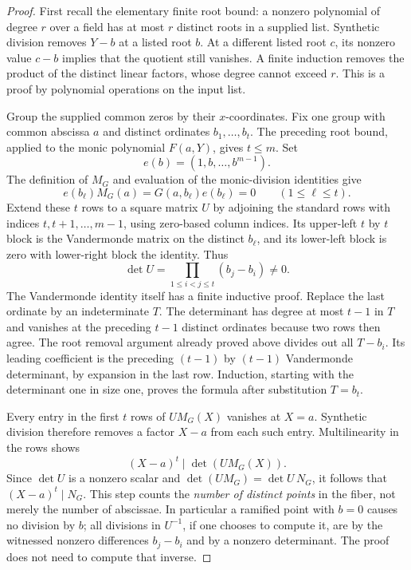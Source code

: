 \begin{proof}
First recall the elementary finite root bound: a nonzero polynomial of
degree $r$ over a field has at most $r$ distinct roots in a supplied
list. Synthetic division removes $Y-b$ at a listed root $b$. At a
different listed root $c$, its nonzero value $c-b$ implies that the
quotient still vanishes. A finite induction removes the product of
the distinct linear factors, whose degree cannot exceed $r$. This
is a proof by polynomial operations on the input list.

Group the supplied common zeros by their $x$-coordinates. Fix one
group with common abscissa $a$ and distinct ordinates
$b_1,\ldots,b_t$. The preceding root bound, applied to the monic
polynomial $F(a,Y)$, gives $t\leq m$. Set
\[
               e(b)=(1,b,\ldots,b^{m-1}).
\]
The definition of $M_G$ and evaluation of the monic-division
identities give
\[
 e(b_\ell)M_G(a)=G(a,b_\ell)e(b_\ell)=0
                    \qquad(1\leq\ell\leq t).
\]
Extend these $t$ rows to a square matrix $U$ by adjoining the
standard rows with indices $t,t+1,\ldots,m-1$, using zero-based
column indices. Its upper-left $t$ by $t$ block is the Vandermonde
matrix on the distinct $b_\ell$, and its lower-left block is zero
with lower-right block the identity. Thus
\[
             \det U=\prod_{1\leq i<j\leq t}(b_j-b_i)\ne0.
\]
The Vandermonde identity itself has a finite inductive proof.
Replace the last ordinate by an indeterminate $T$. The determinant
has degree at most $t-1$ in $T$ and vanishes at the preceding
$t-1$ distinct ordinates because two rows then agree. The root
removal argument already proved above divides out all
$T-b_i$. Its leading coefficient is the preceding $(t-1)$ by
$(t-1)$ Vandermonde determinant, by expansion in the last row.
Induction, starting with the determinant one in size one, proves
the formula after substitution $T=b_t$.

Every entry in the first $t$ rows of $UM_G(X)$ vanishes at $X=a$.
Synthetic division therefore removes a factor $X-a$ from each such
entry. Multilinearity in the rows shows
\[
                        (X-a)^t\mid\det(UM_G(X)).
\]
Since $\det U$ is a nonzero scalar and
$\det(UM_G)=\det U\,N_G$, it follows that
$(X-a)^t\mid N_G$. This step counts the \emph{number of distinct
points} in the fiber, not merely the number of abscissae. In
particular a ramified point with $b=0$ causes no division by $b$;
all divisions in $U^{-1}$, if one chooses to compute it, are by the
witnessed nonzero differences $b_j-b_i$ and by a nonzero determinant.
The proof does not need to compute that inverse.


\end{proof}
